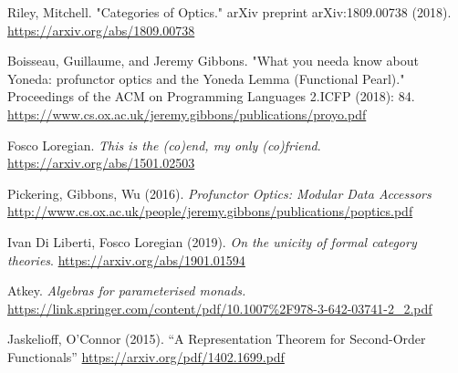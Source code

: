 \documentclass{amsart}
\begin{document}
\begin{thebibliography}{99}
 Riley, Mitchell. "Categories of Optics." arXiv preprint arXiv:1809.00738 (2018).
  \url{https://arxiv.org/abs/1809.00738}

 Boisseau, Guillaume, and Jeremy Gibbons. "What
  you needa know about Yoneda: profunctor optics and the Yoneda Lemma
  (Functional Pearl)." Proceedings of the ACM on Programming Languages
  2.ICFP (2018): 84. \url{https://www.cs.ox.ac.uk/jeremy.gibbons/publications/proyo.pdf}

 Fosco Loregian. \emph{This is the (co)end, my only (co)friend}.
  \url{https://arxiv.org/abs/1501.02503}

 Pickering, Gibbons, Wu (2016). \emph{Profunctor Optics: Modular Data Accessors}
  \url{http://www.cs.ox.ac.uk/people/jeremy.gibbons/publications/poptics.pdf}

 Ivan Di Liberti, Fosco Loregian (2019). \emph{On the unicity of formal category theories}. \url{https://arxiv.org/abs/1901.01594}

 Atkey. \emph{Algebras for parameterised monads.} \url{https://link.springer.com/content/pdf/10.1007\%2F978-3-642-03741-2_2.pdf}

 Jaskelioff, O'Connor (2015). ``A Representation Theorem for Second-Order Functionals''
  \url{https://arxiv.org/pdf/1402.1699.pdf}


\end{thebibliography}
\end{document}
